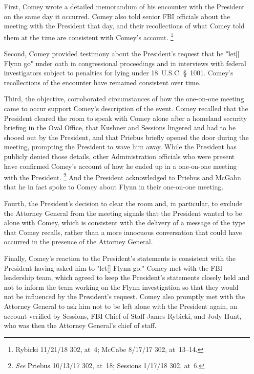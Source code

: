 First, Comey wrote a detailed memorandum of his encounter with the President on the same day it occurred.
Comey also told senior FBI officials about the meeting with the President that day, and their recollections of what Comey told them at the time are consistent with Comey's account.%
\footnote{Rybicki 11/21/18 302, at~4;
McCabe 8/17/17 302, at~13--14.}

Second, Comey provided testimony about the President's request that he "let[] Flynn go" under oath in congressional proceedings and in interviews with federal investigators subject to penalties for lying under 18~U.S.C. \S~1001.
Comey's recollections of the encounter have remained consistent over time.

Third, the objective, corroborated circumstances of how the one-on-one meeting came to occur support Comey's description of the event.
Comey recalled that the President cleared the room to speak with Comey alone after a homeland security briefing in the Oval Office, that Kushner and Sessions lingered and had to be shooed out by the President, and that Priebus briefly opened the door during the meeting, prompting the President to wave him away.
While the President has publicly denied those details, other Administration officials who were present have confirmed Comey's account of how he ended up in a one-on-one meeting with the President.%
\footnote{\textit{See} Priebus 10/13/17 302, at~18;
Sessions 1/17/18 302, at~6.}
And the President acknowledged to Priebus and McGahn that he in fact spoke to Comey about Flynn in their one-on-one meeting.

Fourth, the President's decision to clear the room and, in particular, to exclude the Attorney General from the meeting signals that the President wanted to be alone with Comey, which is consistent with the delivery of a message of the type that Comey recalls, rather than a more innocuous conversation that could have occurred in the presence of the Attorney General.

Finally, Comey's reaction to the President's statements is consistent with the President having asked him to "let[] Flynn go."
Comey met with the FBI leadership team, which agreed to keep the President's statements closely held and not to inform the team working on the Flynn investigation so that they would not be influenced by the President's request.
Comey also promptly met with the Attorney General to ask him not to be left alone with the President again, an account verified by Sessions, FBI Chief of Staff James Rybicki, and Jody Hunt, who was then the Attorney General's chief of staff.

